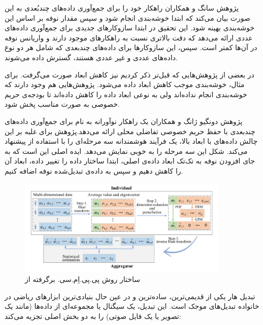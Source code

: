 
پژوهش سانگ و همکاران  راهکار خود را برای جمع‌آوری داده‌های چند‌بُعدی به این صورت بیان می‌کند که ابتدا خوشه‌بندی انجام شود و سپس مقدار نوفه بر اساس این خوشه‌بندی بهینه شود. این تحقیق در ابتدا سازوکار‌های جدیدی برای جمع‌آوری داده‌های عددی ارائه می‌دهد که دقت بالاتری نسبت به راهکارهای موجود دارند و واریانس نوفه در آن‌ها کمتر است. سپس، این سازوکارها برای داده‌های چندبعدی که شامل هر دو نوع داده‌های عددی و غیر عددی هستند، گسترش داده می‌شوند.



در بعضی از پژوهش‌هایی که قبل‌تر ذکر کردیم نیز کاهش ابعاد صورت می‌گرفت. برای مثال، خوشه‌بندی موجب کاهش ابعاد داده می‌شود. پژوهش‌هایی هم وجود دارند که خوشه‌بندی انجام نداده‌اند ولی به نوعی ابعاد داده را کاهش داده‌اند تا بودجه‌ی حریم خصوصی به صورت مناسب پخش شود.


پژوهش دونگیو ژانگ و همکاران  یک راهکار نوآورانه به نام  برای جمع‌آوری داده‌های چندبعدی با حفظ حریم خصوصی تفاضلی محلی ارائه می‌دهد.پژوهش برای غلبه بر این چالش داده‌های با ابعاد بالا، یک فرآیند هوشمندانه سه مرحله‌ای را با استفاده از  پیشنهاد می‌کند. شکل  این سه مرحله را به خوبی نمایش می‌دهد. ایده اصلی این است که به جای افزودن نوفه به تک‌تک ابعاد داده‌ی اصلی، ابتدا ساختار داده را تغییر داده، ابعاد آن را کاهش دهیم و سپس به داده‌ی تبدیل‌شده نوفه اضافه کنیم.

\begin{figure}[h]
  \centering
  \includegraphics[width=0.9\textwidth]{figs/PPMC.jpg}
  \caption{ساختار روش پی.پی.اِم.سی. برگرفته از }
  \label{fig:PPMC}
\end{figure}

تبدیل هار یکی از قدیمی‌ترین، ساده‌ترین و در عین حال بنیادی‌ترین ابزارهای ریاضی در خانواده تبدیل‌های موجک است. این تبدیل، یک سیگنال یا مجموعه‌ای از داده‌ها (مانند یک تصویر یا یک فایل صوتی) را به دو بخش اصلی تجزیه می‌کند:

